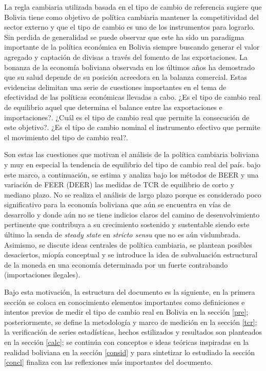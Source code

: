 \documentclass[12pt,letterpaper]{article}
\begin{document}
La regla cambiaria utilizada basada en el tipo de cambio de referencia sugiere que Bolivia tiene como objetivo de política cambiaria mantener la competitividad del sector externo y que el tipo de cambio es uno de los instrumentos para lograrlo. Sin perdida de generalidad se puede observar que este ha sido un paradigma importante de la política económica en Bolivia siempre buscando generar el valor agregado y captación de divisas a través del fomento de las exportaciones. La bonanza de la economía boliviana observada en los últimos años ha demostrado que su salud depende de su posición acreedora en la balanza comercial. Estas evidencias delimitan una serie de cuestiones importantes en el tema de efectividad de las políticas económicas llevadas a cabo. ¿Es el tipo de cambio real de equilibrio aquel que determina el balance entre las exportaciones e importaciones?. ¿Cuál es el tipo de cambio real que permite la consecución de este objetivo?. ¿Es el tipo de cambio nominal el instrumento efectivo que permite el movimiento del tipo de cambio real?. 

Son estas las cuestiones que motivan el análisis de la política cambiaria boliviana y muy en especial la tendencia de equilibrio del tipo de cambio real del país. bajo este marco, a continuación, se estima y analiza bajo los métodos de BEER y una variación de FEER (DEER) las medidas de TCR de equilibrio de corto y mediano plazo. No se realiza el análisis de largo plazo porque es considerado poco significativo para la economía boliviana que aún se encuentra en vías de desarrollo y donde aún no se tiene indicios claros del camino de desenvolvimiento pertinente que contribuya a su crecimiento sostenido y sustentable siendo este último la senda de \emph{steady state} en \emph{stricto sensu} que no es aún vislumbrada. Asimismo, se discute ideas centrales de política cambiaria, se plantean posibles desaciertos, miopía conceptual y se introduce la idea de subvaluación estructural de la moneda en una economía determinada por un fuerte contrabando (importaciones ilegales).

Bajo esta motivación, la estructura del documento es la siguiente, en la primera sección se coloca en conocimiento elementos importantes como definiciones e intentos previos de medir el tipo de cambio real en Bolivia en la sección \ref{pre}; posteriormente, se define la metodología y marco de medición en la sección \ref{tcr}; la verificación de series estadísticas, hechos estilizados y resultados son planteados en la sección \ref{calc}; se continúa con conceptos e ideas teóricas inspiradas en la realidad boliviana en la sección \ref{consid} y para sintetizar lo estudiado la sección \ref{concl} finaliza con las reflexiones más importantes del documento.
\end{document}
